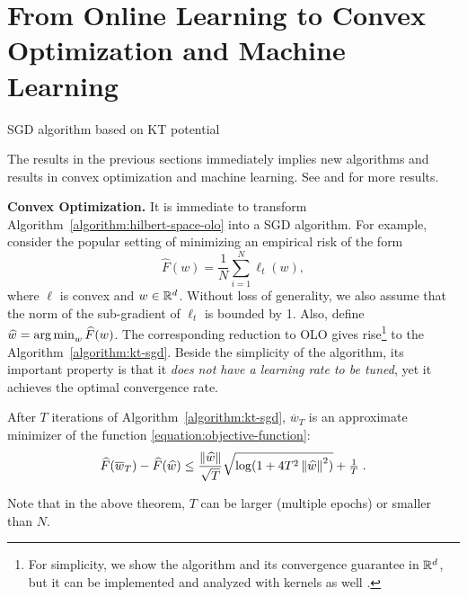 \section{From Online Learning to Convex Optimization and Machine Learning}
\label{section:applications}

\begin{algorithm}[t]
\caption{SGD algorithm based on KT potential \label{algorithm:kt-sgd}}
\begin{algorithmic}[1]
{
\ENDFOR
{}
}
\end{algorithmic}
\end{algorithm}

The results in the previous sections immediately implies new algorithms and
results in convex optimization and machine learning. See \cite{Orabona-2014} and \cite{Luo-Schapire-2015} for more results.

\textbf{Convex Optimization.} It is immediate to transform
Algorithm~\ref{algorithm:hilbert-space-olo} into a \ac{SGD} algorithm.  For
example, consider the popular setting of minimizing an empirical risk of the
form
\begin{equation}
\label{equation:objective-function}
\widehat{F}(w) = \frac{1}{N} \sum_{i=1}^N \ell_t(w),
\end{equation}
where $\ell$ is convex and $w \in \mathbb{R}^d$. Without loss of generality, we also
assume that the norm of the sub-gradient of $\ell_t$ is bounded by 1. Also,
define $\widehat{w}=  \operatorname*{arg\,min}_w \widehat{F}(w)$.  The corresponding reduction to OLO
gives rise\footnote{For simplicity, we show the algorithm and its convergence
guarantee in $\mathbb{R}^d$, but it can be implemented and analyzed with kernels as well \citep{Orabona-2014}.} to the
Algorithm~\ref{algorithm:kt-sgd}.
Beside the simplicity of the algorithm, its important property is that it
\emph{does not have a learning rate to be tuned}, yet it achieves the optimal
convergence rate.
\begin{theorem}
After $T$ iterations of Algorithm~\ref{algorithm:kt-sgd}, $\overline{w}_T$ is
an approximate minimizer of the function \eqref{equation:objective-function}:
$$
\widehat{F}(\overline{w}_T) - \widehat{F}(\widehat{w}) \leq \frac{\left\|{\widehat{w}}\right\|}{\sqrt{T}} \sqrt{\log(1+4 T^2 \left\|{\widehat{w}}\right\|^2)} +\tfrac{1}{T} \; .
$$
\end{theorem}
Note that in the above theorem, $T$ can be larger (multiple epochs) or smaller
than $N$.

